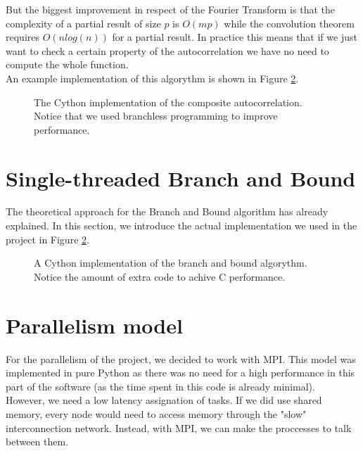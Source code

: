      But the biggest improvement in respect of the Fourier Transform is that
      the complexity of a partial result of size $p$ is $O(mp)$ while the
      convolution theorem requires $O(nlog(n))$ for a partial result. In
      practice this means that if we just want to check a certain property
      of the autocorrelation we have no need to compute the whole function.\\

      An example implementation of this algorythm is shown in Figure \ref{composite_auto:fig:1}.

      \begin{figure}[ht!]
        \caption{The Cython implementation of the composite autocorrelation.
        Notice that we used branchless programming to improve performance.}
        \label{composite_auto:fig:1}
      \end{figure}

  \section{Single-threaded Branch and Bound}

  The theoretical approach for the Branch and Bound algorithm has already
  explained. In this section, we introduce the actual implementation we used
  in the project in Figure \ref{composite_auto:fig:1}. 

  \begin{figure}[ht!]
    \caption{A Cython implementation of the branch and bound algorythm. Notice
    the amount of extra code to achive C performance.}
    \label{composite_auto:fig:1}
  \end{figure}


  \section{Parallelism model}

  For the parallelism of the project, we decided to work with MPI. This model
  was implemented in pure Python as there was no need for a high performance in
  this part of the software (as the time spent in this code is already
  minimal).\\

  However, we need a low latency assignation of tasks. If we did use shared
  memory, every node would need to access memory through the "slow"
  interconnection network. Instead, with MPI, we can make the proccesses to
  talk between them.\\

